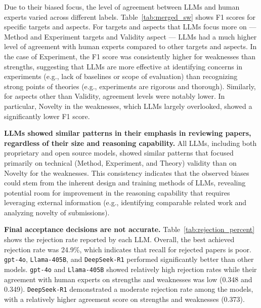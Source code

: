 Due to their biased focus, the level of agreement between LLMs and human experts varied across different labels. Table~\ref{tab:merged_sw} shows F1 scores for specific targets and aspects. For targets and aspects that LLMs focus more on --- Method and Experiment targets and Validity aspect --- LLMs had a much higher level of agreement with human experts compared to other targets and aspects. In the case of Experiment, the F1 score was consistently higher for weaknesses than strengths, suggesting that LLMs are more effective at identifying concerns in experiments (e.g., lack of baselines or scope of evaluation) than recognizing strong points of theories (e.g., experiments are rigorous and thorough). Similarly, for aspects other than Validity, agreement levels were notably lower. In particular, Novelty in the weaknesses, which LLMs largely overlooked, showed a significantly lower F1 score.


\textbf{LLMs showed similar patterns in their emphasis in reviewing papers, regardless of their size and reasoning capability.} All LLMs, including both proprietary and open source models, showed similar patterns that focused primarily on technical (Method, Experiment, and Theory) validity than on Novelty for the weaknesses. This consistency indicates that the observed biases could stem from the inherent design and training methods of LLMs, revealing potential room for improvement in the reasoning capability that requires leveraging external information (e.g., identifying comparable related work and analyzing novelty of submissions). 

\textbf{Final acceptance decisions are not accurate.} Table~\ref{tab:rejection_percent} shows the rejection rate reported by each LLM. Overall, the best achieved rejection rate was 24.9\%, which indicates that recall for rejected papers is poor. \texttt{gpt-4o}, \texttt{Llama-405B}, and \texttt{DeepSeek-R1} performed significantly better than other models. \texttt{gpt-4o} and \texttt{Llama-405B} showed relatively high rejection rates while their agreement with human experts on strengths and weaknesses was low (0.348 and 0.349). \texttt{DeepSeek-R1} demonstrated a moderate rejection rate among the models, with a relatively higher agreement score on strengths and weaknesses (0.373). 

